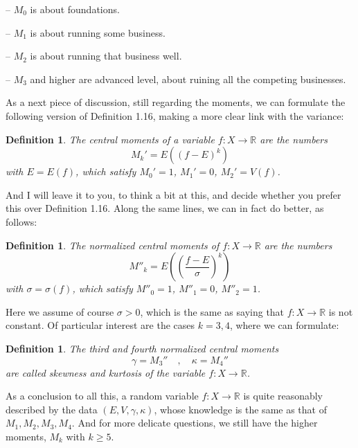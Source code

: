 \documentclass[12pt]{amsbook}
\newtheorem{definition}[theorem]{Definition}
\begin{document}
\medskip

-- $M_0$ is about foundations.

\medskip

-- $M_1$ is about running some business.

\medskip

-- $M_2$ is about running that business well.

\medskip

-- $M_3$ and higher are advanced level, about ruining all the competing businesses. 

\medskip

As a next piece of discussion, still regarding the moments, we can formulate the following version of Definition 1.16, making a more clear link with the variance:


\begin{definition}
The central moments of a variable $f:X\to\mathbb R$ are the numbers
$$M_k'=E((f-E)^k)$$
with $E=E(f)$, which satisfy $M_0'=1$, $M_1'=0$, $M_2'=V(f)$.
\end{definition}

And I will leave it to you, to think a bit at this, and decide whether you prefer this over Definition 1.16. Along the same lines, we can in fact do better, as follows:


\begin{definition}
The normalized central moments of $f:X\to\mathbb R$ are the numbers
$$M''_k=E\left(\left(\frac{f-E}{\sigma}\right)^k\right)$$
with $\sigma=\sigma(f)$, which satisfy $M''_0=1$, $M''_1=0$, $M''_2=1$.
\end{definition}

Here we assume of course $\sigma>0$, which is the same as saying that $f:X\to\mathbb R$ is not constant. Of particular interest are the cases $k=3,4$, where we can formulate:


\begin{definition}
The third and fourth normalized central moments
$$\gamma=M_3''\quad,\quad 
\kappa=M_4''$$
are called skewness and kurtosis of the variable $f:X\to\mathbb R$.
\end{definition}

As a conclusion to all this, a random variable $f:X\to\mathbb R$ is quite reasonably described by the data $(E,V,\gamma,\kappa)$, whose knowledge is the same as that of $M_1,M_2,M_3,M_4$. And for more delicate questions, we still have the higher moments, $M_k$ with $k\geq5$.
\end{document}
